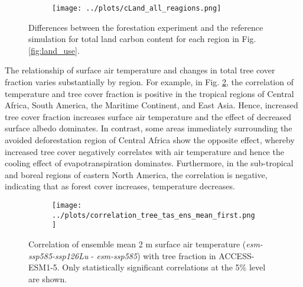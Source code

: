 \documentclass[]{article}
\begin{document}
\begin{figure}[H]
    \centering
    \begin{subfigure}[b]{\linewidth}
        \texttt{[image: ../plots/cLand\_all\_reagions.png]}
    \end{subfigure}

    \caption{Differences between the forestation experiment and the reference simulation for total land carbon content for each region in Fig. \ref{fig:land_use}.}
    \label{fig:accesss_regional_cland}
\end{figure}

The relationship of surface air temperature and changes in total tree cover fraction varies substantially by region.
For example, in Fig. \ref{fig:map_tas_tree_correlation}, the correlation of temperature and tree cover fraction is positive in the tropical regions of Central Africa, South America, the Maritime Continent, and East Asia.
Hence, increased tree cover fraction increases surface air temperature and the effect of decreased surface albedo dominates.
In contrast, some areas immediately surrounding the avoided deforestation region of Central Africa show the opposite effect, whereby increased tree cover negatively correlates with air temperature and hence the cooling effect of evapotranspiration dominates.
Furthermore, in the sub-tropical and boreal regions of eastern North America, the correlation is negative, indicating that as forest cover increases, temperature decreases.

\begin{figure}[H]
    \centering
    \begin{subfigure}[b]{0.7\linewidth}
        \texttt{[image: ../plots/correlation\_tree\_tas\_ens\_mean\_first.png]}
    \end{subfigure}
    \caption{Correlation of ensemble mean 2 m surface air temperature (\textit{esm-ssp585-ssp126Lu} - \textit{esm-ssp585}) with tree fraction in ACCESS-ESM1-5. Only statistically significant correlations at the 5\% level are shown.}
    \label{fig:map_tas_tree_correlation}
\end{figure}
\end{document}
